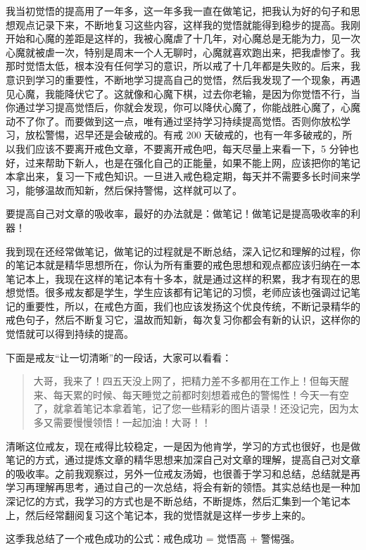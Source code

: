 \documentclass[fontset=founder]{ctexart}
\begin{document}
我当初觉悟的提高用了一年多，这一年多我一直在做笔记，把我认为好的句子和思想观点记录下来，不断地复习这些内容，这样我的觉悟就能得到稳步的提高。我刚开始和心魔的差距是这样的，我被心魔虐了十几年，对心魔总是无能为力，见一次心魔就被虐一次，特别是周末一个人无聊时，心魔就喜欢跑出来，把我虐惨了。我那时觉悟太低，根本没有任何学习的意识，所以戒了十几年都是失败的。后来，我意识到学习的重要性，不断地学习提高自己的觉悟，然后我发现了一个现象，再遇见心魔，我能降伏它了。这就像和心魔下棋，过去你老输，是因为你觉悟不行，当你通过学习提高觉悟后，你就会发现，你可以降伏心魔了，你能战胜心魔了，心魔动不了你了。而要做到这一点，唯有通过坚持学习持续提高觉悟。否则你放松学习，放松警惕，迟早还是会破戒的。有戒 200 天破戒的，也有一年多破戒的，所以我们应该不要离开戒色文章，不要离开戒色吧，每天尽量上来看一下，5 分钟也好，过来帮助下新人，也是在强化自己的正能量，如果不能上网，应该把你的笔记本拿出来，复习一下戒色知识。一旦进入戒色稳定期，每天并不需要多长时间来学习，能够温故而知新，然后保持警惕，这样就可以了。

要提高自己对文章的吸收率，最好的办法就是：做笔记！做笔记是提高吸收率的利器！

我到现在还经常做笔记，做笔记的过程就是不断总结，深入记忆和理解的过程，你的笔记本就是精华思想所在，你认为所有重要的戒色思想和观点都应该归纳在一本笔记本上，我现在这样的笔记本有十多本，就是通过这样的积累，我才有现在的思想觉悟。很多戒友都是学生，学生应该都有记笔记的习惯，老师应该也强调过记笔记的重要性，所以，在戒色方面，我们也应该发扬这个优良传统，不断记录精华的戒色句子，然后不断复习它，温故而知新，每次复习你都会有新的认识，这样你的觉悟就可以得到持续的提高。

下面是戒友“让一切清晰”的一段话，大家可以看看：

\begin{quote}
    大哥，我来了！四五天没上网了，把精力差不多都用在工作上！但每天醒来、每天累的时候、每天睡觉之前都时刻想着戒色的警惕性！今天一有空了，就拿着笔记本拿着笔，记了您一些精彩的图片语录！还没记完，因为太多又需要慢慢领悟！一起加油！大哥！！
\end{quote}

清晰这位戒友，现在戒得比较稳定，一是因为他肯学，学习的方式也很好，也是做笔记的方式，通过提炼文章的精华思想来加深自己对文章的理解，提高自己对文章的吸收率。之前我观察过，另外一位戒友汤姆，也很善于学习和总结，总结就是再学习再理解再思考，通过自己的一次总结，将会有新的领悟。其实总结也是一种加深记忆的方式，我学习的方式也是不断总结，不断提炼，然后汇集到一个笔记本上，然后经常翻阅复习这个笔记本，我的觉悟就是这样一步步上来的。

这季我总结了一个戒色成功的公式：戒色成功 = 觉悟高 + 警惕强。
\end{document}
